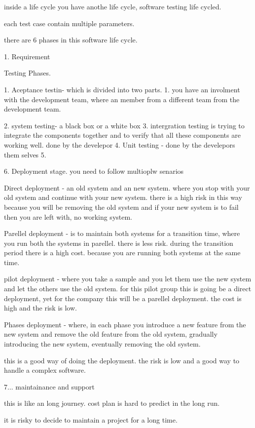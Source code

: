 \documentclass[a4paper]{article}
\begin{document}
inside a life cycle you have anothe life cycle, software testing life cycled.

each test case contain multiple parameters.
  
there are 6 phases in this software life cycle.

1. Requirement 


Testing Phases. 

1. Aceptance testin- which is divided into two parts.
    1. you have an involment with the development team, where an member from a different team from the development team.

2. system testing- a black box or a white box 
3. intergration testing is trying to integrate the components together and to verify that all these components are working well. done by the develepor
4. Unit testing - done by the develepors them selves
5.

6. Deployment stage.
 you need to follow multioplw senarios

Direct deployment - an old system and an new system. where you stop with your old system and continue with your new system.
there is a high risk in this way because you will be removing the old system and if your new system is to fail then you are left with, 
no working system.

Parellel deployment - is to maintain both systems for a transition time, where you run both the systems in parellel.
there is less risk. during the transition period there is a high cost. because you are running both systems at the same time.

pilot deployment - where you take a sample and you let them use the new system and let the others use the old system. for this pilot group this is 
going be a direct deployment, yet for the company this will be a parellel deployment. 
the cost is high and the risk is low.

Phases deployment - where, in each phase you introduce a new feature from the new system and remove the old feature from the old system, gradually
introducing the new system, eventually removing the old system.

this is a good way of doing the deployment.
the risk is low 
and a good way to handle a complex software.

7...
maintainance and support    

this is like an long journey.
cost plan is hard to predict in the long run.

it is risky to decide to maintain a project for a long time.
\end{document}
